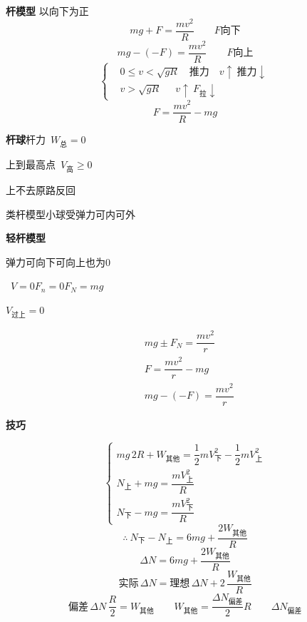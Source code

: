 \textbf{杆模型}
以向下为正
\[ mg+F=\dfrac{mv^2}{R}\qquad F\text{向下} \]
\[ mg-(-F)=\dfrac{mv^2}{R}\qquad F\text{向上} \]
\[
\left\{\begin{aligned}
&0\le v<\sqrt{gR}\quad\text{推力}\quad v\uparrow\ \text{推力}\downarrow\\
&v>\sqrt{gR}\quad\ \ v\uparrow\ F_{\text{拉}}\downarrow
\end{aligned}\right.
\]
\[ F=\dfrac{mv^2}{R}-mg \]

\textbf{杆球}\quad 杆力\ $W_{\text{总}}=0$

上到最高点\ $V_{\text{高}}\ge0$

上不去\quad 原路反回 %

类杆模型\quad 小球受弹力可内可外



\textbf{轻杆模型}


弹力可向下\quad 可向上\quad 也为0

\ $V=0$\quad $F_n=0$\quad $F_N=mg$

$V_{\text{过上}}=0$


\begin{align*}
& mg\pm F_N=\dfrac{mv^2}{r}\\
& F=\dfrac{mv^2}{r}-mg\\
& mg-(-F)=\dfrac{mv^2}{r}
\end{align*}

\textbf{技巧}


\[
\begin{cases}
mg\,2R+W_{\text{其他}}=\dfrac{1}{2}mV_{\text{下}}^{2}-\dfrac{1}{2}mV_{\text{上}}^{2}\\[4pt]
N_{\text{上}}+mg=\dfrac{mV_{\text{上}}^{2}}{R}\\[4pt]
N_{\text{下}}-mg=\dfrac{mV_{\text{下}}^{2}}{R}
\end{cases}
\]
\[ \therefore\ N_{\text{下}}-N_{\text{上}}=6mg+\frac{2W_{\text{其他}}}{R} \]
\[ \Delta N=6mg+\frac{2W_{\text{其他}}}{R} \]
\[ \text{实际}\,\Delta N=\text{理想}\,\Delta N+2\,\frac{W_{\text{其他}}}{R} \]
\[ \text{偏差}\,\Delta N\,\frac{R}{2}=W_{\text{其他}}\qquad W_{\text{其他}}=\frac{\Delta N_{\text{偏差}}}{2}R\qquad \Delta N_{\text{偏差}} \]


